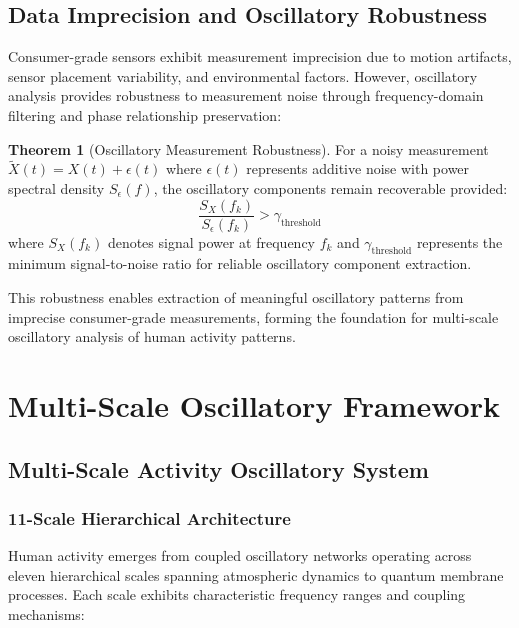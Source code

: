 \documentclass[12pt,a4paper]{article}
\theoremstyle{definition}
\newtheorem{theorem}{Theorem}[section]
\begin{document}
\subsection{Data Imprecision and Oscillatory Robustness}

Consumer-grade sensors exhibit measurement imprecision due to motion artifacts, sensor placement variability, and environmental factors. However, oscillatory analysis provides robustness to measurement noise through frequency-domain filtering and phase relationship preservation:

\begin{theorem}[Oscillatory Measurement Robustness]
For a noisy measurement $\tilde{X}(t) = X(t) + \epsilon(t)$ where $\epsilon(t)$ represents additive noise with power spectral density $S_\epsilon(f)$, the oscillatory components remain recoverable provided:
\begin{equation}
\frac{S_X(f_k)}{S_\epsilon(f_k)} > \gamma_{\text{threshold}}
\end{equation}
where $S_X(f_k)$ denotes signal power at frequency $f_k$ and $\gamma_{\text{threshold}}$ represents the minimum signal-to-noise ratio for reliable oscillatory component extraction.
\end{theorem}

This robustness enables extraction of meaningful oscillatory patterns from imprecise consumer-grade measurements, forming the foundation for multi-scale oscillatory analysis of human activity patterns.

\section{Multi-Scale Oscillatory Framework}

\subsection{Multi-Scale Activity Oscillatory System}

\subsubsection{11-Scale Hierarchical Architecture}

Human activity emerges from coupled oscillatory networks operating across eleven hierarchical scales spanning atmospheric dynamics to quantum membrane processes. Each scale exhibits characteristic frequency ranges and coupling mechanisms:
\end{document}
